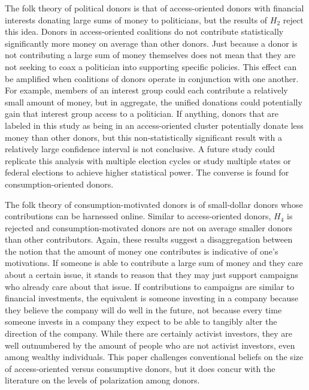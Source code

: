 \documentclass[12pt,]{article}
\begin{document}
The folk theory of political donors is that of access-oriented donors
with financial interests donating large sums of money to politicians,
but the results of \(H_{2}\) reject this idea. Donors in access-oriented
coalitions do not contribute statistically significantly more money on
average than other donors. Just because a donor is not contributing a
large sum of money themselves does not mean that they are not seeking to
coax a politician into supporting specific policies. This effect can be
amplified when coalitions of donors operate in conjunction with one
another. For example, members of an interest group could each contribute
a relatively small amount of money, but in aggregate, the unified
donations could potentially gain that interest group access to a
politician. If anything, donors that are labeled in this study as being
in an access-oriented cluster potentially donate less money than other
donors, but this non-statistically significant result with a relatively
large confidence interval is not conclusive. A future study could
replicate this analysis with multiple election cycles or study multiple
states or federal elections to achieve higher statistical power. The
converse is found for consumption-oriented donors.

The folk theory of consumption-motivated donors is of small-dollar
donors whose contributions can be harnessed online. Similar to
access-oriented donors, \(H_{4}\) is rejected and consumption-motivated
donors are not on average smaller donors than other contributors. Again,
these results suggest a disaggregation between the notion that the
amount of money one contributes is indicative of one's motivations. If
someone is able to contribute a large sum of money and they care about a
certain issue, it stands to reason that they may just support campaigns
who already care about that issue. If contributions to campaigns are
similar to financial investments, the equivalent is someone investing in
a company because they believe the company will do well in the future,
not because every time someone invests in a company they expect to be
able to tangibly alter the direction of the company. While there are
certainly activist investors, they are well outnumbered by the amount of
people who are not activist investors, even among wealthy individuals.
This paper challenges conventional beliefs on the size of
access-oriented versus consumptive donors, but it does concur with the
literature on the levels of polarization among donors.
\end{document}
